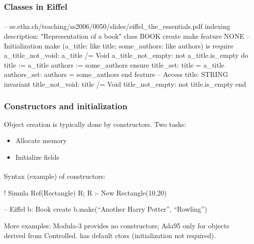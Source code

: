 \documentclass{beamer}
\begin{document}
\begin{frame}[fragile]
\frametitle{Classes in  Eiffel}
\framesubtitle{}
\begin{eiffel}
-- se.ethz.ch/teaching/ss2006/0050/slides/eiffel_the_essentials.pdf
indexing 
     description: "Representation of a book" 
class 
     BOOK 
create 
     make 
feature {NONE} -- Initialization 
     make (a_title: like title; some_authors: like authors) is 
          require 
                a_title_not_void: a_title /= Void 
                a_title_not_empty: not a_title.is_empty 
          do 
                title := a_title 
                authors := some_authors 
          ensure 
               title_set: title = a_title 
               authors_set: authors = some_authors 
          end 
feature -- Access 
     title: STRING 
invariant 
     title_not_void: title /= Void 
     title_not_empty: not title.is_empty 
end
\end{eiffel}
\end{frame}



\begin{frame}[fragile]
\frametitle{Constructors and initialization}
Object creation is typically done by constructors. Two tasks:
\begin{itemize}
\item Allocate memory 
\item Initialize fields
\end{itemize}
\framesubtitle{}
\bigskip

Syntax (example) of constructors:
\begin{eiffel}
! Simula
Ref(Rectangle) R;
R :- New Rectangle(10,20)

-- Eiffel
b: Book
create b.make(``Another Harry Potter'', ``Rowling'')
\end{eiffel}
\bigskip

More examples: Modula-3 provides no constructors; Ada95 only for 
objects derived from Controlled. \Cpp has default ctors (initialization
not required).
\end{frame}
\end{document}

